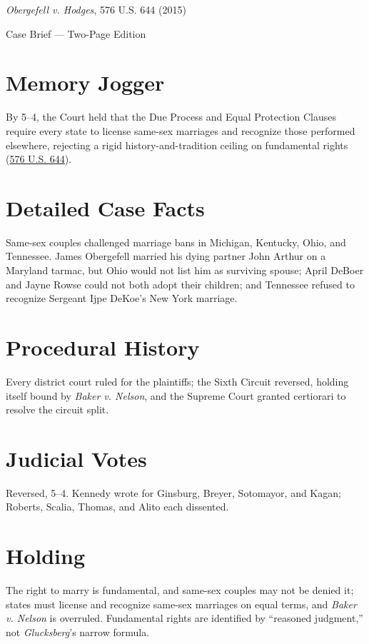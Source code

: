 \documentclass[12pt]{article}
\begin{document}
\begin{center}
{\LARGE \textit{Obergefell v. Hodges}, 576 U.S. 644 (2015)\par}
\vspace{0.5em}
{\large Case Brief --- Two-Page Edition\par}
\end{center}

\section{Memory Jogger}
By 5--4, the Court held that the Due Process and Equal Protection Clauses require every state to license same-sex marriages and recognize those performed elsewhere, rejecting a rigid history-and-tradition ceiling on fundamental rights (\href{https://www.courtlistener.com/opinion/2812209/obergefell-v-hodges/}{576 U.S. 644}).

\section{Detailed Case Facts}
Same-sex couples challenged marriage bans in Michigan, Kentucky, Ohio, and Tennessee. James Obergefell married his dying partner John Arthur on a Maryland tarmac, but Ohio would not list him as surviving spouse; April DeBoer and Jayne Rowse could not both adopt their children; and Tennessee refused to recognize Sergeant Ijpe DeKoe's New York marriage.

\section{Procedural History}
Every district court ruled for the plaintiffs; the Sixth Circuit reversed, holding itself bound by \textit{Baker v. Nelson}, and the Supreme Court granted certiorari to resolve the circuit split.

\section{Judicial Votes}
Reversed, 5--4. Kennedy wrote for Ginsburg, Breyer, Sotomayor, and Kagan; Roberts, Scalia, Thomas, and Alito each dissented.

\section{Holding}
The right to marry is fundamental, and same-sex couples may not be denied it; states must license and recognize same-sex marriages on equal terms, and \textit{Baker v. Nelson} is overruled. Fundamental rights are identified by ``reasoned judgment,'' not \textit{Glucksberg}'s narrow formula.
\end{document}
